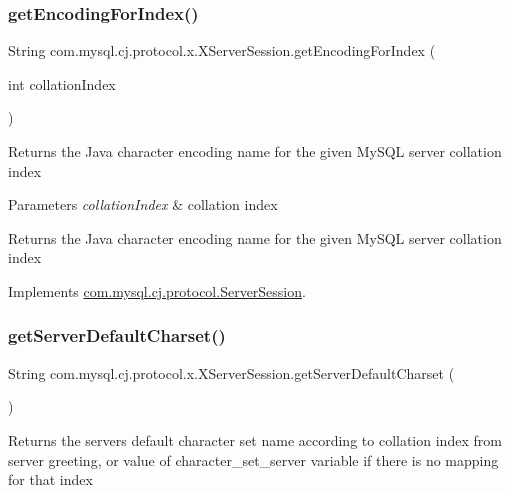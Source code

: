 \subsubsection{\texorpdfstring{get\+Encoding\+For\+Index()}{getEncodingForIndex()}}
{\footnotesize\ttfamily String com.\+mysql.\+cj.\+protocol.\+x.\+X\+Server\+Session.\+get\+Encoding\+For\+Index (\begin{DoxyParamCaption}\item[{int}]{collation\+Index }\end{DoxyParamCaption})}

Returns the Java character encoding name for the given My\+S\+QL server collation index


\begin{DoxyParams}{Parameters}
{\em collation\+Index} & collation index \\
\hline
\end{DoxyParams}
\begin{DoxyReturn}{Returns}
the Java character encoding name for the given My\+S\+QL server collation index 
\end{DoxyReturn}


Implements \mbox{\hyperlink{interfacecom_1_1mysql_1_1cj_1_1protocol_1_1_server_session_a437ab4e5fb2cdd6cc66f206bce8688cd}{com.\+mysql.\+cj.\+protocol.\+Server\+Session}}.

\mbox{\label{classcom_1_1mysql_1_1cj_1_1protocol_1_1x_1_1_x_server_session_a7258b06a9876fde6f4ca0726a8fff500}} 
\subsubsection{\texorpdfstring{get\+Server\+Default\+Charset()}{getServerDefaultCharset()}}
{\footnotesize\ttfamily String com.\+mysql.\+cj.\+protocol.\+x.\+X\+Server\+Session.\+get\+Server\+Default\+Charset (\begin{DoxyParamCaption}{ }\end{DoxyParamCaption})}

\begin{DoxyReturn}{Returns}
the server\textquotesingle{}s default character set name according to collation index from server greeting, or value of \textquotesingle{}character\+\_\+set\+\_\+server\textquotesingle{} variable if there is no mapping for that index 
\end{DoxyReturn}



